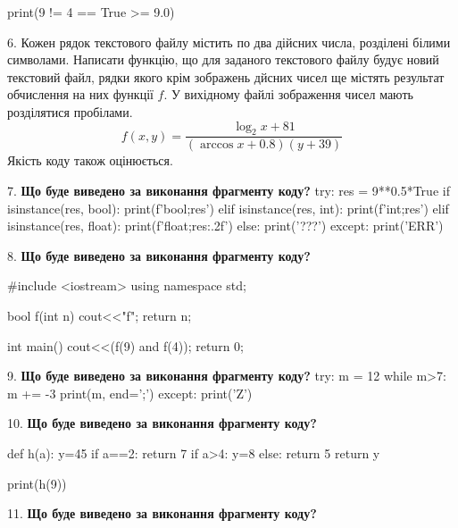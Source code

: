 \documentclass[11pt]{article}
\begin{document}
print(9 != 4 == True >= 9.0)
\par\vspace{5mm}

6. 
Кожен рядок текстового файлу містить по два дійсних числа, розділені білими символами.
Написати функцію, що для заданого текстового файлу будує новий текстовий файл, рядки якого крім зображень дйсних чисел ще містять результат обчислення на них функції $f$. У вихідному файлі зображення чисел мають розділятися пробілами. 
$$f(x, y) =\frac{\log_{2} x + 81}{(\arccos x + 0.8) (y + 39)}$$ 
Якість коду також оцінюється.

\par\vspace{5mm}

7. \textbf{Що буде виведено за виконання фрагменту коду?}
try:
    res = 9**0.5*True
    if isinstance(res, bool):
        print(f'bool;{res}')
    elif isinstance(res, int):
        print(f'int;{res}')
    elif isinstance(res, float):
        print(f'float;{res:.2f}')
    else:
        print('???')
except:
    print('ERR')
\par\vspace{5mm}

8. \textbf{Що буде виведено за виконання фрагменту коду?}

#include <iostream>
using namespace std;

bool f(int n){
    cout<<"f";
    return n;
}

int main(){
    cout<<(f(9) and f(4));
    return 0;
}
\par\vspace{5mm}

9. \textbf{Що буде виведено за виконання фрагменту коду?}
try:
    m = 12
    while m>7:
        m += -3
    print(m, end=';')
except:
    print('Z')
\par\vspace{5mm}

10. \textbf{Що буде виведено за виконання фрагменту коду?}

def h(a):
    y=45
    if a==2: 
        return 7
    if a>4:
         y=8
    else:
         return 5
    return y

print(h(9))
\par\vspace{5mm}

11. \textbf{Що буде виведено за виконання фрагменту коду?}
\end{document}
